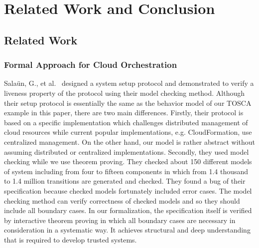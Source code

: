 \documentclass[12pt]{report}
\begin{document}
\chapter{Related Work and Conclusion}
\label{chap:conclusion}
\section{Related Work}
\subsection{Formal Approach for Cloud Orchestration}
Sala{\"u}n, G., et
al.~\cite{EtcheversCBP11,SalaunBCPEG13,SalaunEPBC13} designed a system
setup protocol and demonstrated to verify a liveness property of the
protocol using their model checking method. Although their setup
protocol is essentially the same as the behavior model of our TOSCA
example in this paper, there are two main differences. Firstly, their
protocol is based on a specific implementation which challenges
distributed management of cloud resources while current popular
implementations, e.g. CloudFormation, use centralized management. On
the other hand, our model is rather abstract without assuming
distributed or centralized implementations. Secondly, they used model
checking while we use theorem proving. They checked about 150
different models of system including from four to fifteen components
in which from 1.4 thousand to 1.4 million transitions are generated
and checked. They found a bug of their specification because checked
models fortunately included error cases. The model checking method can
verify correctness of checked models and so they should include all
boundary cases. In our formalization, the specification itself is
verified by interactive theorem proving in which all boundary cases
are necessary in consideration in a systematic way. It achieves
structural and deep understanding that is required to develop trusted
systems.

\end{document}
